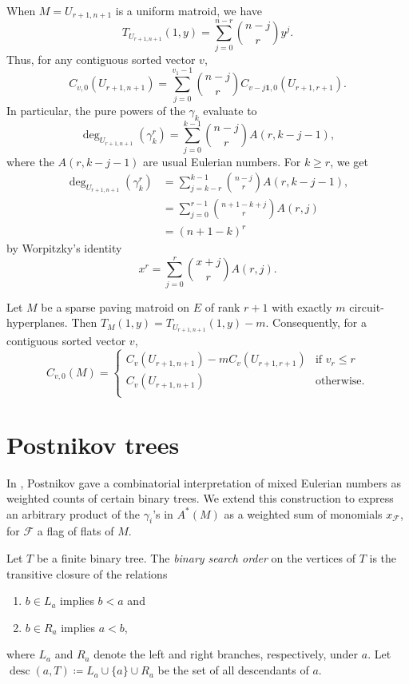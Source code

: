 \documentclass[ALCO,published]{cedram}
\numberwithin{equation}{section}
\numberwithin{figure}{section}
\newcommand{\cF}{\mathcal{F}}
\DeclareMathOperator{\desc}{desc}
\begin{document}
\begin{exam}
  When $M = U_{r+1,n+1}$ is a uniform matroid, we have
  \[ T_{U_{r+1,n+1}}(1,y) = \sum_{j=0}^{n-r} \binom{n-j}{r} y^j. \]
  Thus, for any contiguous sorted vector $v$,
  \[ C_{v,0}(U_{r+1,n+1}) = \sum_{j=0}^{v_1-1} \binom{n - j}{r} C_{v - j\mathbf{1},0}(U_{r+1,r+1}). \]
  In particular, the pure powers of the $\gamma_k$ evaluate to
  \[ \deg_{U_{r+1,n+1}}(\gamma_k^r) = \sum_{j=0}^{k-1} \binom{n-j}{r} A(r,k-j-1), \]
  where the $A(r,k-j-1)$ are usual Eulerian numbers.
  For $k \geq r$, we get
  \begin{align*}
  	\deg_{U_{r+1,n+1}}(\gamma_k^r) 
		&= \sum_{j=k-r}^{k-1} \binom{n-j}{r} A(r,k-j-1), \\
		&= \sum_{j=0}^{r-1} \binom{n+1-k+j}{r} A(r,j) \\
		&= (n+1-k)^r
  \end{align*}
  by Worpitzky's identity
  \[ x^r = \sum_{j=0}^r \binom{x+j}{r} A(r,j). \]
\end{exam}

\begin{exam}
  Let $M$ be a sparse paving matroid on $E$ of rank $r+1$ with exactly $m$ circuit-hyperplanes. Then $T_M(1,y) = T_{U_{r+1,n+1}}(1,y) - m$. Consequently, for a contiguous sorted vector $v$,
  \[ C_{v,0}(M) = 
  \begin{cases}
  	C_{v}(U_{r+1,n+1}) - m C_{v}(U_{r+1,r+1}) & \text{if } v_r \leq r \\
	C_{v}(U_{r+1,n+1}) & \text{otherwise.} \\
  \end{cases}
  \] 
\end{exam}


\section{Postnikov trees} \label{s:trees}

In \cite[Section 17]{Postnikov:permutohedra}, Postnikov gave a combinatorial interpretation of mixed Eulerian numbers as weighted counts of certain binary trees. We extend this construction to express an arbitrary product of the $\gamma_i$'s in $A^*(M)$ as a weighted sum of monomials $x_{\cF}$, for $\cF$ a flag of flats of $M$.

Let $T$ be a finite binary tree. 
The {\em binary search order} on the vertices of $T$ is the transitive closure of the relations
\begin{enumerate}
    \item $b\in L_a$ implies $b<a$ and
    \item $b\in R_a$ implies $a<b$,
\end{enumerate}
where $L_a$ and $R_a$ denote the left and right branches, respectively, under $a$. 
Let $\desc(a,T)\coloneqq L_a\cup\{a\}\cup R_a$ be the set of all descendants of $a$.
\end{document}
